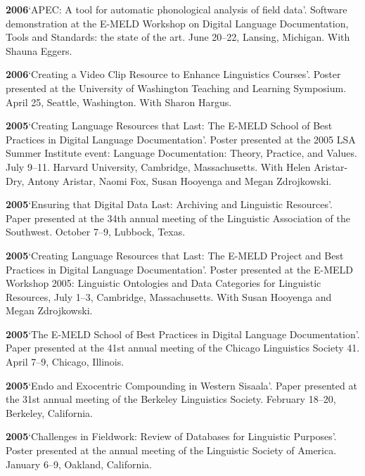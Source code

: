 \documentclass[11pt]{article}
\newcommand{\hangpara}{
 \setlength{\parindent}{0in} %
 \hangindent=0.42in %
}
\begin{document}
\vskip 6pt
\hangpara
{\bf 2006}\hspace{1ex}`APEC: A tool for automatic phonological analysis of field data'. Software demonstration at the E-MELD Workshop on Digital Language Documentation, Tools and Standards: the state of the art. June 20--22, Lansing, Michigan. With Shauna Eggers.

\vskip 6pt
\hangpara
{\bf 2006}\hspace{1ex}`Creating a Video Clip Resource to Enhance Linguistics Courses'. Poster presented at the University of Washington Teaching and Learning Symposium. April 25, Seattle, Washington. With Sharon Hargus.

\vskip 6pt
\hangpara
{\bf 2005}\hspace{1ex}`Creating Language Resources that Last: The E-MELD School of Best Practices in Digital Language Documentation'. Poster presented at the 2005 LSA Summer Institute event: Language Documentation: Theory, Practice, and Values. July 9--11. Harvard University, Cambridge, Massachusetts. With Helen Aristar-Dry, Antony Aristar, Naomi Fox, Susan Hooyenga and Megan Zdrojkowski.

\vskip 6pt
\hangpara
{\bf 2005}\hspace{1ex}`Ensuring that Digital Data Last: Archiving and Linguistic Resources'. Paper presented at the 34th annual meeting of the Linguistic Association of the Southwest. October 7--9, Lubbock, Texas. 
 
\vskip 6pt
\hangpara
{\bf 2005}\hspace{1ex}`Creating Language Resources that Last: The E-MELD Project and Best Practices in Digital Language Documentation'. Poster presented at the E-MELD Workshop 2005: Linguistic Ontologies and Data Categories for Linguistic Resources, July 1--3, Cambridge, Massachusetts. With Susan Hooyenga and Megan Zdrojkowski.

\vskip 6pt
\hangpara
{\bf 2005}\hspace{1ex}`The E-MELD School of Best Practices in Digital Language Documentation'. Paper presented at the 41st annual meeting of the Chicago Linguistics Society 41. April 7--9, Chicago, Illinois.

\vskip 6pt
\hangpara
{\bf 2005}\hspace{1ex}`Endo and Exocentric Compounding in Western Sisaala'. Paper presented at the 31st annual meeting of the Berkeley Linguistics Society. February 18--20, Berkeley, California.

\vskip 6pt
\hangpara
{\bf 2005}\hspace{1ex}`Challenges in Fieldwork: Review of Databases for Linguistic Purposes'. Poster presented at the annual meeting of the Linguistic Society of America. January 6--9, Oakland, California.
\end{document}
